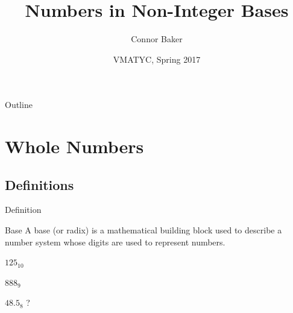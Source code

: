 \documentclass{beamer}
\title{Numbers in Non-Integer Bases}
\author{Connor Baker}
\institute{NVCC} %
\date{VMATYC, Spring 2017}
\begin{document}
\begin{frame}
  \titlepage
\end{frame}

\begin{frame}{Outline}
  \tableofcontents
\end{frame}










\section{Whole Numbers}










\subsection{Definitions}
\begin{frame}{Definition}
  \begin{block}{Base}
    A base (or radix) is a mathematical building block used to describe a number system whose digits are used to represent numbers.
  \end{block}\pause

  \begin{example}\pause
    $125_{10}$ \pause

    $888_9$ \pause

    $48.5_8$ \pause ?
  \end{example}
\end{frame}
\end{document}
